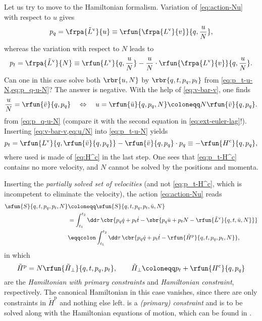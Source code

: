 \documentclass[a4paper]{article}
\begin{document}
Let us try to move to the Hamiltonian formalism. Variation of 
\cref{eq:action-Nu} with respect to $u$ gives
\begin{equation}
p_q = \frpa{\tilde L^\text{v}}{u} \equiv
\rfun{\frpa{L^\text{v}}{v}}{q, \frac{u}{N}},
\label{eq:p_q-u-N}
\end{equation}
whereas the variation with respect to $N$ leads to
\begin{equation}
p_t = \frpa{\tilde L^\text{v}}{N} \equiv
\rfun{L^\text{v}}{q, \frac{u}{N}} - \frac{u}{N}\cdot
\rfun{\frpa{L^\text{v}}{v}}{q,\frac{u}{N}}.
\label{eq:p_t-u-N}
\end{equation}
Can one in this case solve both $\rbr{u, N}$ by $\rbr{q, t, p_q, p_t}$ from 
\cref{eq:p_t-u-N,eq:p_q-u-N}? The answer is negative. With the help of 
\cref{eq:v-bar-v}, one finds
\begin{equation}
\frac{u}{N} = \rfun{\bar v}{q, p_q} \quad \Leftrightarrow \quad
u = \rfun{\bar u}{q, p_q, N} \coloneqq N \rfun{\bar v}{q, p_q}.
\label{eq:u/N}
\end{equation}
from \cref{eq:p_q-u-N} (compare it with the second equation in 
\cref{eq:ext-euler-lag}!). Inserting \cref{eq:v-bar-v,eq:u/N} into
\cref{eq:p_t-u-N} yields
\begin{equation}
p_t = \rfun{L^\text{v}}{q, \rfun{\bar v}{q, p_q}} -
\rfun{\bar v}{q, p_q}\cdot p_q
\equiv -\rfun{H^\text{c}}{q, p_q},
\label{eq:p_t-H^c}
\end{equation}
where used is made of \cref{eq:H^c} in the last step. One sees that 
\cref{eq:p_t-H^c} contains no more velocity, and $N$ cannot be solved by the 
positions and momenta.

Inserting the \emph{partially solved set of velocities} (and not 
\cref{eq:p_t-H^c}, which is incompetent to eliminate the velocity), the action
\cref{eq:action-Nu} reads
\begin{align}
\sfun{S}{q, t, p_q, p_t, N} &\coloneqq \sfun{S}{q, t, p_q, p_t, \bar 
u, N} \nonumber \\
&= \int_{t_1}^{t_2}\dd \tau\,\cbr{p_q \dot q + p_t \dot t - \sbr{ p_q \bar u + 
p_t N - \rfun{\tilde L^\text{v}}{q, t, \bar u, N}}} \nonumber \\
& \eqqcolon \int_{t_1}^{t_2}\dd \tau\,
\cbr{p_q \dot q + p_t\dot t - \rfun{\tilde H^\text{p}}{q, t, p_q, p_t, N}},
\end{align}
in which
\begin{equation}
\tilde H^\text{p} = N \rfun{\tilde H_\perp}{q, t, p_q, p_t},\qquad
\tilde H_\perp \coloneqq p_t + \rfun{H^\text{c}}{q, p_q}
\end{equation}
are the \emph{Hamiltonian with primary constraints} and \emph{Hamiltonian 
constraint}, respectively. The canonical Hamiltonian in this case vanishes, 
since there are only constraints in $\tilde H^\text{p}$ and nothing else left. 
 is a \emph{(primary) constraint} and is to be solved along 
with the Hamiltonian equations of motion, which can be found in 
\cite[ch.~2]{Gitman_1990}.






\printbibliography
\end{document}
